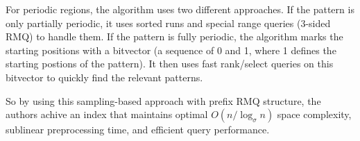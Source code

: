For periodic regions, the algorithm uses two different approaches. If the pattern is only partially periodic, it uses sorted runs and special range queries (3-sided RMQ) to handle them. If the pattern is fully periodic, the algorithm marks the starting positions with a bitvector (a sequence of 0 and 1, where 1 defines the starting postions of the pattern). It then uses fast rank/select queries on this bitvector to quickly find the relevant patterns.

So by using this sampling-based approach with prefix RMQ structure, the authors achive an index that maintains optimal \( O(n / \log_{\sigma} n) \) space complexity, sublinear preprocessing time, and efficient query performance.
